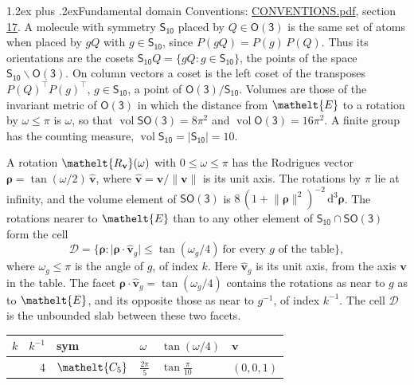 \documentclass[10pt,a4paper]{article}
\makeatletter
\renewcommand\section{\@startsection{section}{1}{\z@}{-3ex plus -1ex minus -.2ex}%
  {1.2ex plus .2ex}{\normalfont\large\sffamily\bfseries\color{parttitle}}}
\numberwithin{equation}{section}
\newcommand{\eltfont}[1]{{\let\sigma\eltsigma\mathelt{#1}}}
\newcommand{\grp}[1]{\mathsf{#1}}
\newcommand{\cls}[1]{\eltfont{#1}}
\newcommand{\elt}[1]{\eltfont{#1}}
\newcommand{\dirvec}[3]{(#1, #2, #3)}
\newcommand{\unitaxis}{\hat{\mathbf{v}}}
\newcommand{\vv}{\mathbf{v}}
\newcommand{\diff}{\mathrm{d}}
\newcommand{\vol}{\operatorname{vol}}
\newcommand{\rodrigues}{\boldsymbol{\rho}}
\newcommand{\fcell}{\mathcal{D}}
\makeatother
\begin{document}
\section{Fundamental domain}\label{s:fundamental_domain}
Conventions: \href{../../CONVENTIONS.pdf}{CONVENTIONS.pdf}, section \href{../../CONVENTIONS.pdf\#conv.17}{17}.
\leavevmode\label{n:element.placement}A molecule with symmetry $\grp{S_{10}}$ placed by $Q \in \grp{O(3)}$ is the same set of atoms when placed by $gQ$ with $g \in \grp{S_{10}}$, since $P(gQ) = P(g)\,P(Q)$. \label{n:operator.cosets}Thus its orientations are the cosets $\grp{S_{10}}Q = \{gQ : g \in \grp{S_{10}}\}$, the points of the space $\grp{S_{10}}\backslash\grp{O(3)}$. On column vectors a coset is the left coset of the transposes $P(Q)^{\top}P(g)^{\top}$, $g \in \grp{S_{10}}$, a point of $\grp{O(3)}/\grp{S_{10}}$.
\leavevmode\label{n:operator.volume}Volumes are those of the invariant metric of \href{O3.pdf}{$\grp{O(3)}$} in which the distance from $\elt{E}$ to a rotation by $\omega \le \pi$ is $\omega$, so that $\vol\grp{SO(3)} = 8\pi^2$ and $\vol\grp{O(3)} = 16\pi^2$. A finite group has the counting measure, $\vol\grp{S_{10}} = |\grp{S_{10}}| = 10$.

\leavevmode\label{n:vector.rodrigues}\label{n:vector.unitaxis}A rotation $\elt{R_{\vv}}(\omega)$ with $0 \le \omega \le \pi$ has the Rodrigues vector $\rodrigues = \tan(\omega/2)\,\unitaxis$, where $\unitaxis = \vv/\lVert\vv\rVert$ is its unit axis. The rotations by $\pi$ lie at infinity, and the volume element of \href{SO3.pdf}{$\grp{SO(3)}$} is $8\,(1 + \lVert\rodrigues\rVert^2)^{-2}\,\diff^3\rodrigues$.
\leavevmode\label{n:set.cell}The rotations nearer to $\elt{E}$ than to any other element of $\grp{S_{10}} \cap \grp{SO(3)}$ form the cell
\begin{equation}\label{e:cell}\fcell = \bigl\{\rodrigues : \lvert\rodrigues\cdot\unitaxis_g\rvert \le \tan(\omega_g/4)\ \text{for every $g$ of the table}\bigr\},\end{equation}
where $\omega_g \le \pi$ is the angle of $g$, of index $k$. Here $\unitaxis_g$ is its unit axis, from the axis $\vv$ in the table. The facet $\rodrigues\cdot\unitaxis_g = \tan(\omega_g/4)$ contains the rotations as near to $g$ as to $\elt{E}$, and its opposite those as near to $g^{-1}$, of index $k^{-1}$. The cell $\fcell$ is the unbounded slab between these two facets.
{\small{\renewcommand{\arraystretch}{1.3}\begin{longtable}{@{}rrllll@{}}\toprule
$k$ & $k^{-1}$ & sym & $\omega$ & $\tan(\omega/4)$ & $\vv$\\\midrule\endhead
\bottomrule\endfoot\endlastfoot
1 & 4 & $\cls{C_{5}}$ & $\tfrac{2\pi}{5}$ & $\tan\tfrac{\pi}{10}$ & $\dirvec{0}{0}{1}$\\
\bottomrule\end{longtable}}}
\end{document}
